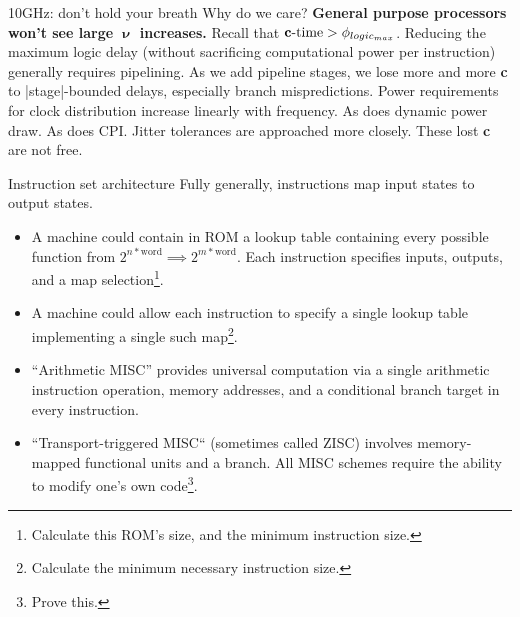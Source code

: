 \documentclass[mathserif,xcolor={dvipsnames,table}]{beamer}
\begin{document}
\begin{frame}{10GHz: don't hold your breath}
Why do we care?
\vfill
\textbf{General purpose processors won't see large $\boldsymbol \upnu$ increases.}
\vfill
Recall that $\text{\textbf{c}-time} > \phi_{logic_{max}}$. Reducing the maximum logic
delay (without sacrificing computational power per instruction) generally
requires pipelining. As we add pipeline stages, we lose more and more
\textbf{c} to |stage|-bounded delays, especially branch mispredictions.
\vfill
Power requirements for clock distribution increase linearly with frequency.
As does dynamic power draw. As does CPI. Jitter tolerances are approached
more closely. These lost \textbf{c} are not free.
\end{frame}

\begin{frame}{Instruction set architecture}
Fully generally, instructions map input states to output states.
\small{
\begin{itemize}
\item A machine could contain in ROM a lookup table containing every possible
function from $2^{n*\text{word}}\implies 2^{m*\text{word}}$. Each instruction
specifies inputs, outputs, and a map selection\footnote{Calculate this ROM's size, and the minimum instruction size.}.
\item A machine could allow each instruction to specify a single lookup table implementing
a single such map\footnote{Calculate the minimum necessary instruction size.}.
\item ``Arithmetic MISC'' provides universal computation via a single arithmetic instruction
operation, memory addresses, and a conditional branch target in every instruction.
\item``Transport-triggered MISC`` (sometimes called ZISC) involves memory-mapped
functional units and a branch. All MISC schemes require the ability to modify one's
own code\footnote{Prove this.}.
\end{itemize}
}
\end{frame}
\end{document}
